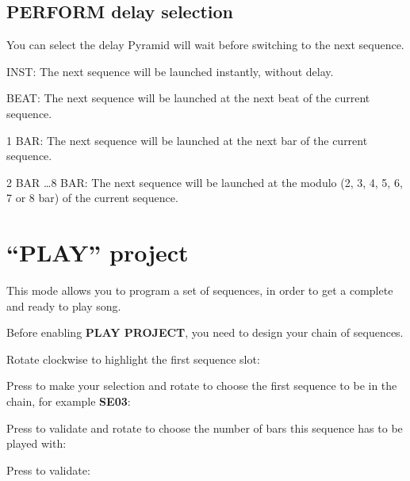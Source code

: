 \subsection{PERFORM delay selection}

You can select the delay Pyramid will wait before switching to the next sequence.


INST: The next sequence will be launched instantly, without delay.

BEAT: The next sequence will be launched at the next beat of the current sequence.

1 BAR: The next sequence will be launched at the next bar of the current sequence.

2 BAR \ldots 8 BAR: The next sequence will be launched at the modulo (2, 3, 4, 5, 6, 7 or 8 bar) of the current sequence.


\section{“PLAY” project}

This mode allows you to program a set of sequences, in order to get a complete and ready to play song.

Before enabling \textbf{PLAY PROJECT}, you need to design your chain of sequences.

Rotate clockwise \encodericon{} to highlight the first sequence slot:


Press \encodericon{} to make your selection and rotate \encodericon{} to choose the first sequence to be in the chain, for example \textbf{SE03}:


Press \encodericon{} to validate and rotate \encodericon{} to choose the number of bars this sequence has to be played with:



Press \encodericon{} to validate:


